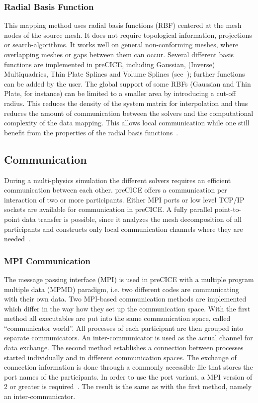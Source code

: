   \subsubsection{Radial Basis Function}\label{sec:Coupl-DataMapping-RBF}
   This mapping method uses radial basis functions (RBF) centered at the mesh nodes of the source mesh. It does not require topological information, projections or search-algorithms. It works well on general non-conforming meshes, where overlapping meshes or gaps between them can occur. Several different basis functions are implemented in preCICE, including Gaussian, (Inverse) Multiquadrics, Thin Plate Splines and Volume Splines (see~\cite{bungartz2015fully}); further functions can be added by the user. The global support of some RBFs (Gaussian and Thin Plate, for instance) can be limited to a smaller area by introducing a cut-off radius. This reduces the density of the system matrix for interpolation and thus reduces the amount of communication between the solvers and the computational complexity of the data mapping. This allows local communication while one still benefit from the properties of the radial basis functions~\cite{bungartz2015fully}.


 \subsection{Communication} \label{sec:Coupl-Communication}
  During a multi-physics simulation the different solvers requires an efficient communication between each other. preCICE offers a communication per interaction of two or more participants. Either MPI ports or low level TCP/IP sockets are available for communication in preCICE. A fully parallel point-to-point data transfer is possible, since it analyzes the mesh decomposition of all participants and constructs only local communication channels where they are needed~\cite{bungartz2015fully}.
 
  \subsubsection{MPI Communication}\label{sec:Coupl-Communication-MPI}
   The message passing interface (MPI) is used in preCICE with a multiple program multiple data (MPMD) paradigm, i.e. two different codes are communicating with their own data. Two MPI-based communication methods are implemented which differ in the way how they set up the communication space. With the first method all executables are put into the same communication space, called ``communicator world''. All processes of each participant are then grouped into separate communicators. An inter-communicator is used as the actual channel for data exchange. The second method establishes a connection between processes started individually and in different communication spaces. The exchange of connection information is done through a commonly accessible file that stores the port names of the participants. In order to use the port variant, a MPI version of 2 or greater is required~\cite{gatzhammer2015efficient}. The result is the same as with the first method, namely an inter-communicator.
   
